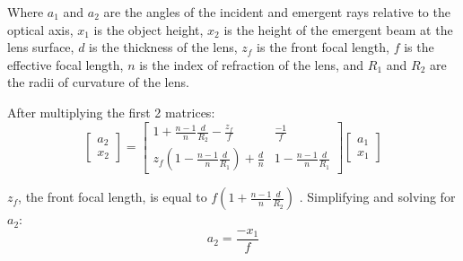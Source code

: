 Where $a_1$ and $a_2$ are the angles of the incident and emergent rays relative to the optical axis, $x_1$ is the object height, $x_2$ is the height of the emergent beam at the lens surface, $d$ is the thickness of the lens, $z_f$ is the front focal length, $f$ is the effective focal length, $n$ is the index of refraction of the lens, and $R_1$ and $R_2$ are the radii of curvature of the lens. 

After multiplying the first 2 matrices:
\[ 
\begin{bmatrix} a_2\\x_2 \end{bmatrix} =
\begin{bmatrix}
1 +\frac{n-1}{n}\frac{d}{R_2} - \frac{z_f}{f} & \frac{-1}{f}\\
z_f\left(1 - \frac{n-1}{n}\frac{d}{R_1}\right) + \frac{d}{n} & 1 - \frac{n-1}{n}\frac{d}{R_1}
\end{bmatrix}
\begin{bmatrix}
a_1\\
x_1
\end{bmatrix}
\]

$z_f$, the front focal length, is equal to $f\left(1 + \frac{n-1}{n}\frac{d}{R_2}\right)$ \cite{MIT_Lec5}. Simplifying and solving for $a_2$:
\begin{equation}
    \boxed{a_2 = \frac{-x_1}{f}}
\end{equation}







